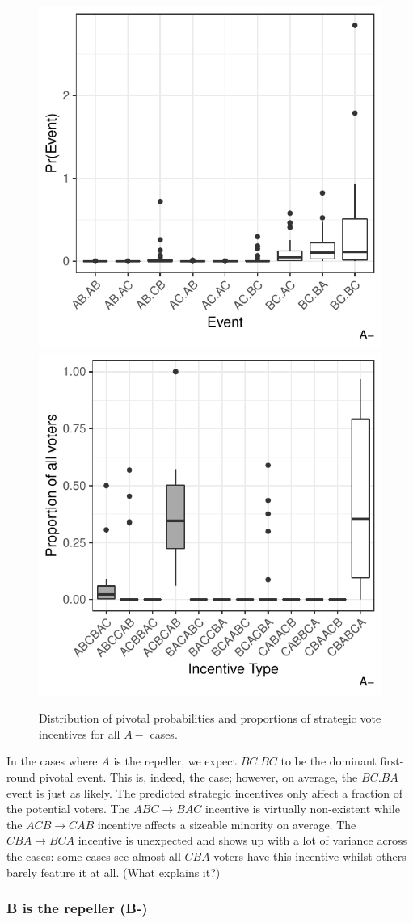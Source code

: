 \documentclass[11pt, letter]{article}
\begin{document}
\begin{figure}[!htb]
	\centering
	\includegraphics[width = .45\textwidth]{../output/figures/prediction/pprob_dm_a.pdf}
	\includegraphics[width = .45\textwidth]{../output/figures/prediction/svinc_dm_a.pdf}
	\caption{Distribution of pivotal probabilities and proportions of strategic vote incentives for all $A-$ cases.}
	\label{fig:figure1}
\end{figure}

In the cases where $A$ is the repeller, we expect $BC.BC$ to be the dominant first-round pivotal event. This is, indeed, the case; however, on average, the $BC.BA$ event is just as likely. The predicted strategic incentives only affect a fraction of the potential voters. The $ABC \rightarrow BAC$ incentive is virtually non-existent while the $ACB \rightarrow CAB$ incentive affects a sizeable minority on average. The $CBA \rightarrow BCA$ incentive is unexpected and shows up with a lot of variance across the cases: some cases see almost all $CBA$ voters have this incentive whilst others barely feature it at all. (What explains it?)

\subsubsection{B is the repeller (B-)}
\end{document}
